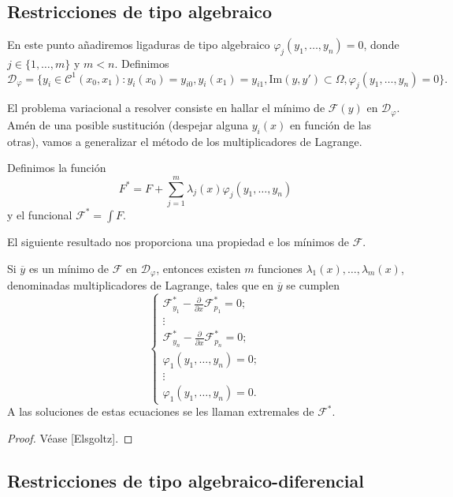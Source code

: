 \documentclass{article}
\begin{document}
\subsection{Restricciones de tipo algebraico}

En este punto añadiremos ligaduras de tipo algebraico $\varphi_j(y_1, \ldots, y_n) = 0$, donde
$j \in \{1, \ldots, m\}$ y $m < n$. Definimos
\[\mathcal{D}_\varphi = \{y_i \in \mathcal{C}^1(x_0, x_1): y_i(x_0) = y_{i0}, y_i(x_1) = y_{i1},
  \mathrm{Im}(y, y') \subset \Omega, \varphi_j(y_1, \ldots, y_n) = 0\}.\]

El problema variacional a resolver consiste en hallar el mínimo de $\mathcal{F}(y)$ en
$\mathcal{D}_\varphi$. Amén de una posible sustitución (despejar alguna $y_i(x)$ en función de las
otras), vamos a generalizar el método de los multiplicadores de Lagrange.

 Definimos la función
\[F^* = F + \sum_{j = 1}^m \lambda_j(x) \varphi_j(y_1, \ldots, y_n)\] y el funcional
$\mathcal{F}^* = \int F$.

El siguiente resultado nos proporciona una propiedad e los mínimos de $\mathcal{F}$.

\begin{thm}
  Si $\overline{y}$ es un mínimo de $\mathcal{F}$ en $\mathcal{D}_\varphi$, entonces existen $m$
  funciones $\lambda_1(x), \ldots, \lambda_m(x)$, denominadas multiplicadores de Lagrange, tales que
  en $\overline{y}$ se cumplen
  \[
    \begin{cases}
      \mathcal{F}_{y_1}^* - \frac{\partial}{\partial x} \mathcal{F}_{p_1}^* = 0; \\
      \vdots \\
      \mathcal{F}_{y_n}^* - \frac{\partial}{\partial x} \mathcal{F}_{p_n}^* = 0; \\
      \varphi_1(y_1, \dots, y_n) = 0; \\
      \vdots \\
      \varphi_1(y_1, \dots, y_n) = 0.
    \end{cases}
  \]
  A las soluciones de estas ecuaciones se les llaman extremales de $\mathcal{F}^*$.
\end{thm}
\begin{proof}
  Véase [Elsgoltz].
\end{proof}

\subsection{Restricciones de tipo algebraico-diferencial}
\end{document}
